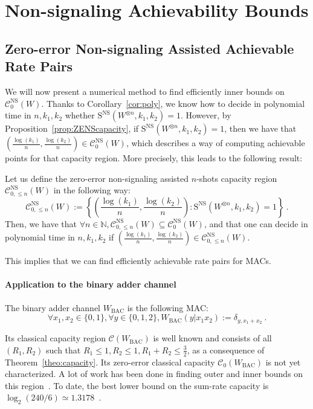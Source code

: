 \section{Non-signaling Achievability Bounds}
\label{section:IB}
\subsection{Zero-error Non-signaling Assisted Achievable Rate Pairs}
We will now present a numerical method to find efficiently inner bounds on $\mathcal{C}_0^{\mathrm{NS}}(W)$. Thanks to Corollary~\ref{cor:poly}, we know how to decide in polynomial time in $n,k_1,k_2$ whether $\mathrm{S}^{\mathrm{NS}}(W^{\otimes n},k_1,k_2)=1$. However, by Proposition~\ref{prop:ZENScapacity}, if $\mathrm{S}^{\mathrm{NS}}(W^{\otimes n},k_1,k_2)=1$, then we have that $\left(\frac{\log(k_1)}{n},\frac{\log(k_2)}{n}\right) \in \mathcal{C}_0^{\mathrm{NS}}(W)$, which describes a way of computing achievable points for that capacity region. More precisely, this leads to the following result:

\begin{proposition}
  \label{prop:IB}
  Let us define the zero-error non-signaling assisted $n$-shots capacity region $\mathcal{C}_{0,\leq n}^{\mathrm{NS}}(W)$ in the following way:
  \[ \mathcal{C}_{0,\leq n}^{\mathrm{NS}}(W)  := \left\{ \left(\frac{\log(k_1)}{n},\frac{\log(k_2)}{n}\right) : \mathrm{S}^{\mathrm{NS}}(W^{\otimes n},k_1,k_2)=1 \right\}\ . \]
  Then, we have that $\forall n \in \mathbb{N}, \mathcal{C}_{0,\leq n}^{\mathrm{NS}}(W) \subseteq \mathcal{C}_0^{\mathrm{NS}}(W)$, and that one can decide in polynomial time in $n,k_1,k_2$ if $\left(\frac{\log(k_1)}{n},\frac{\log(k_2)}{n}\right) \in \mathcal{C}_{0,\leq n}^{\mathrm{NS}}(W)$.
\end{proposition}

This implies that we can find efficiently achievable rate pairs for MACs.

\paragraph{Application to the binary adder channel}
The binary adder channel $W_{\text{BAC}}$ is the following MAC:
\[ \forall x_1,x_2 \in \{0,1\}, \forall y \in \{0,1,2\}, W_{\text{BAC}}(y|x_1x_2) := \delta_{y,x_1+x_2} \ .\]

Its classical capacity region $\mathcal{C}(W_{\text{BAC}})$ is well known and consists of all $(R_1,R_2)$ such that $R_1 \leq 1,R_2 \leq 1, R_1+R_2 \leq \frac{3}{2}$, as a consequence of Theorem~\ref{theo:capacity}. Its zero-error classical capacity $\mathcal{C}_0(W_{\text{BAC}})$ is not yet characterized. A lot of work has been done in finding outer and inner bounds on this region~\cite{Lindstrom69,Tilborg78,KL78,Weldon78,KLWY83,BT85,BB98,UL98,AB99,MO05,OS15}. To date, the best lower bound on the sum-rate capacity is $\log_2(240/6) \simeq 1.3178$~\cite{MO05}.

